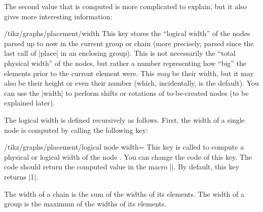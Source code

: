 The second value that is computed is more complicated to explain, but
it also gives more interesting information:
\begin{key}{/tikz/graphs/placement/width}
  This key stores the ``logical width'' of the nodes parsed up to now
  in the current group or chain (more precisely, parsed since the last
  call of |place| in an enclosing group). This is not necessarily the
  ``total physical width'' of the nodes, but rather a number
  representing how ``big'' the elements prior to the current element
  were. This \emph{may} be their width, but it may also be their
  height or even their number (which, incidentally, is the default). 
  You can use the |width| to perform shifts or rotations of
  to-be-created nodes (to be explained later).
  
  The logical width is defined recursively as follows. First, the
  width of a single node is computed by calling the following key:
  \begin{key}{/tikz/graphs/placement/logical node width=}
    This key is called to compute a physical or logical width of the
    node . You can change the code of this
    key. The code should return the computed value in the macro
    |\pgfmathresult|. By default, this key returns |1|.
  \end{key}
  The width of a chain is the sum of the widths of its elements. The 
  width of a group is the maximum of the widths of its elements.


\end{key}
